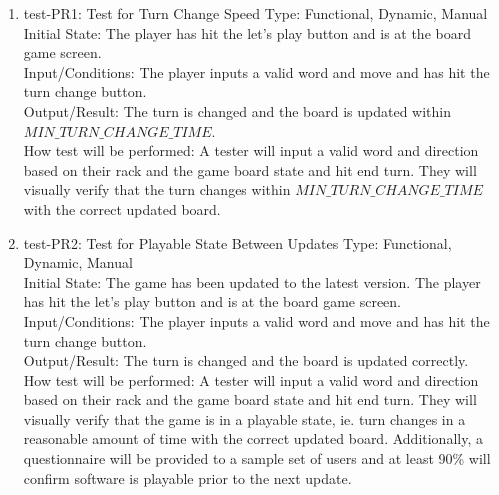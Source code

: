 \documentclass[12pt, titlepage]{article}
\begin{document}
\begin{enumerate}
    \item{test-PR1: Test for Turn Change Speed} %
    Type: Functional, Dynamic, Manual\\
    Initial State: The player has hit the let's play button and is at the board game screen.\\
    Input/Conditions: The player inputs a valid word and move and has hit the turn change button.\\
    Output/Result:  The turn is changed and the board is updated within $MIN\_TURN\_CHANGE\_TIME$.\\
    How test will be performed: A tester will input a valid word and direction based on their rack and the game board state and hit end turn. They will visually verify that the turn changes within $MIN\_TURN\_CHANGE\_TIME$ with the correct updated board.\\
    
    \item{test-PR2: Test for Playable State Between Updates} %
    Type: Functional, Dynamic, Manual\\
    Initial State: The game has been updated to the latest version. The player has hit the let's play button and is at the board game screen.\\
    Input/Conditions: The player inputs a valid word and move and has hit the turn change button.\\
    Output/Result:  The turn is changed and the board is updated correctly.\\
    How test will be performed: A tester will input a valid word and direction based on their rack and the game board state and hit end turn. They will visually verify that the game is in a playable state, ie. turn changes in a reasonable amount of time with the correct updated board. Additionally, a questionnaire will be provided to a sample set of users and at least 90\% will confirm software is playable prior to the next update.\\
\end{enumerate}
\end{document}
